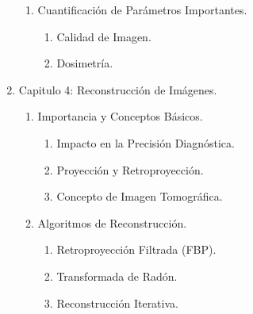 \begin{enumerate}
\begin{enumerate}
        \item Cuantificación de Parámetros Importantes.
        \begin{enumerate}
            \item Calidad de Imagen.
            \item Dosimetría.
        \end{enumerate}
    \end{enumerate}
    \item Capitulo 4: Reconstrucción de Imágenes.
    \begin{enumerate}
        \item Importancia y Conceptos Básicos.
        \begin{enumerate}
            \item Impacto en la Precisión Diagnóstica.
            \item Proyección y Retroproyección.
            \item Concepto de Imagen Tomográfica.
        \end{enumerate}
        \item Algoritmos de Reconstrucción.
        \begin{enumerate}
            \item Retroproyección Filtrada (FBP).
            \item Transformada de Radón.
            \item Reconstrucción Iterativa.
        \end{enumerate}
    \end{enumerate}
\end{enumerate}
